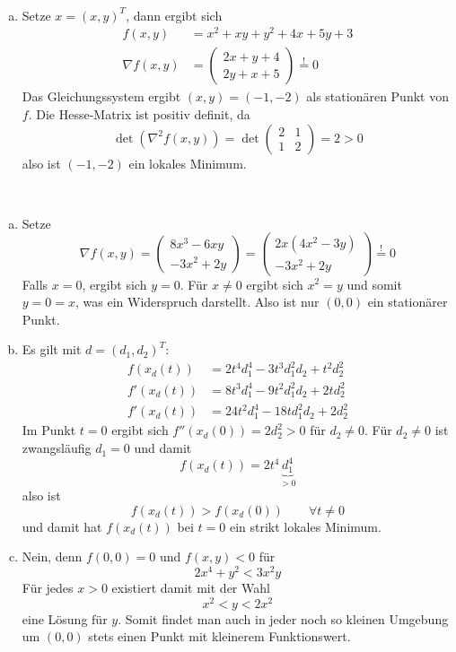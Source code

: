 \documentclass[a4paper]{scrartcl}
\begin{document}
\setcounter{aufgabe}{1}
\begin{aufgabe}~

	\begin{enumerate}[a)]
		\item
			Setze $x = (x,y)^T$, dann ergibt sich
			\begin{align*}
				f(x,y) &= x^2 + xy + y^2 + 4x + 5y + 3 \\
				\nabla f(x,y) &= \begin{pmatrix}
					2x + y + 4 \\
					2y + x + 5
				\end{pmatrix} \stackrel != 0
			\end{align*}
			Das Gleichungssystem ergibt $(x,y) = (-1,-2)$ als stationären Punkt von $f$.
			Die Hesse-Matrix ist positiv definit, da
			\[
				\det(\nabla^2 f(x,y)) = \det\begin{pmatrix}
					2 & 1 \\
					1 & 2
				\end{pmatrix} = 2 > 0
			\]
			also ist $(-1,-2)$ ein lokales Minimum.
	\end{enumerate}
\end{aufgabe}

\begin{aufgabe}~

	\begin{enumerate}[a)]
		\item
			Setze
			\[
				\nabla f(x,y) = \begin{pmatrix}
					8x^3 - 6xy \\
					-3x^2 + 2y
				\end{pmatrix} = \begin{pmatrix}
					2x(4x^2-3y) \\
					-3x^2 + 2y
				\end{pmatrix}\stackrel != 0
			\]
			Falls $x = 0$, ergibt sich $y=0$.
			Für $x \neq 0$ ergibt sich $x^2 = y$ und somit $y=0=x$, was ein Widerspruch darstellt.
			Also ist nur $(0,0)$ ein stationärer Punkt.
		\item
			Es gilt mit $d=(d_1,d_2)^T$:
			\begin{align*}
				f(x_d(t)) &= 2t^4d_1^4 - 3t^3 d_1^2 d_2 + t^2 d_2^2 \\
				f'(x_d(t)) &= 8t^3d_1^4 - 9t^2 d_1^2d_2 + 2td_2^2 \\
				f'(x_d(t)) &= 24t^2 d_1^4 - 18 t d_1^2 d_2 + 2d_2^2
			\end{align*}
			Im Punkt $t=0$ ergibt sich $f''(x_d(0)) = 2d_2^2 > 0$ für $d_2 \neq 0$.
			Für $d_2 \neq 0$ ist zwangsläufig $d_1 = 0$ und damit
			\[
				f(x_d(t)) = 2t^4 \underbrace{d_1^4}_{>0}
			\]
			also ist
			\[
				f(x_d(t)) > f(x_d(0)) \qquad \forall t \neq 0
			\]
			und damit hat $f(x_d(t))$ bei $t=0$ ein strikt lokales Minimum.
		\item
			Nein, denn $f(0,0) = 0$ und $f(x,y) < 0$ für
			\[
					2x^4 + y^2 < 3x^2y
			\]
			Für jedes $x>0$ existiert damit mit der Wahl
			\[
				x^2 < y < 2x^2
			\]
			eine Lösung für $y$.
			Somit findet man auch in jeder noch so kleinen Umgebung um $(0,0)$ stets einen Punkt mit kleinerem Funktionswert.
	\end{enumerate}
\end{aufgabe}
\end{document}
